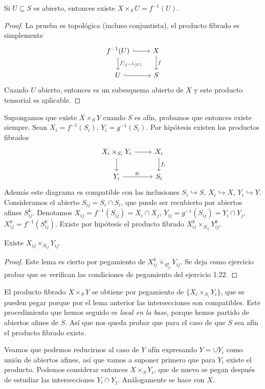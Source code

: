 \documentclass[GA.tex]{subfiles}
\begin{document}
\begin{dem}
\begin{lemma}
Si $U\subseteq S$ es abierto, entonces existe $X\times_S U=f^{-1}(U)$. 
\end{lemma}
\begin{proof}
La prueba es topológica (incluso conjuntista), el producto fibrado es simplemente
\[
\begin{tikzcd}
f^{-1}(U)\arrow[r, hookrightarrow] \arrow[d, "f|_{f^{-1}(U)}"] & X\arrow[d, "f"]\\
U\arrow[r, hookrightarrow] & S
\end{tikzcd}
\]
Cuando $U$ abierto, entonces es un subesquema abierto de $X$ y este producto tensorial es aplicable.
\end{proof}
Supongamos que existe $X\times_S Y$ cuando $S$ es afín, probamos que entonces existe siempre. Sean $X_i=f^{-1}(S_i)$, $Y_i=g^{-1}(S_i)$. Por hipótesis existen los productos fibrados
\[
\begin{tikzcd}
X_i\times_{S_i} Y_i\arrow[r]\arrow[d] & X_i\arrow[d, "f_i"]\\
Y_i\arrow[r, "g_i"] & S_i
\end{tikzcd}
\]
Además este diagrama es compatible con las inclusiones $S_i\hookrightarrow S$, $X_i\hookrightarrow X$, $Y_i\hookrightarrow Y$. Consideramos el abierto $S_{ij}=S_i\cap S_i$, que puede ser recubierto por abiertos afines $S_{ij}^k$. Denotamos $X_{ij}=f^{-1}(S_{ij})=X_i\cap X_j$, $Y_{ij}=g^{-1}(S_{ij})=Y_i\cap Y_j$, $X_{ij}^k=f^{-1}(S_{ij}^k)$. Existe por hipótesis el producto fibrado $X_{ij}^k\times_{S_{ij}} Y_{ij}^k$. 

\begin{lemma}
Existe $X_{ij}\times_{S_{ij}} Y_{ij}$. 
\end{lemma}
\begin{proof}
Este lema es cierto por pegamiento de $X_{ij}^k\times_{S_{ij}^k} Y_{ij}$. Se deja como ejercicio probar que se verifican las condiciones de pegamiento del ejercicio 1.22.
\end{proof}
El producto fibrado $X\times_S Y$ se obtiene por pegamiento de $\{X_i\times_{S_i}Y_i\}$, que se pueden pegar porque por el lema anterior las intersecciones son compatibles. Este procedimiento que hemos seguido es \emph{local en la base}, porque hemos partido de abiertos afines de $S$. Así que nos queda probar que para el caso de que $S$ sea afín el producto fibrado existe. 

Veamos que podemos reducirnos al caso de $Y$ afín expresando $Y=\cup Y_i$ como unión de abiertos afines, así que vamos a suponer primero que para $Y_i$ existe el producto. Podemos considerar entonces $X\times_S Y_i$, que de nuevo se pegan después de estudiar las intersecciones $Y_i\cap Y_j$. Análogamente se hace con $X$. 
\end{dem}
\end{document}
